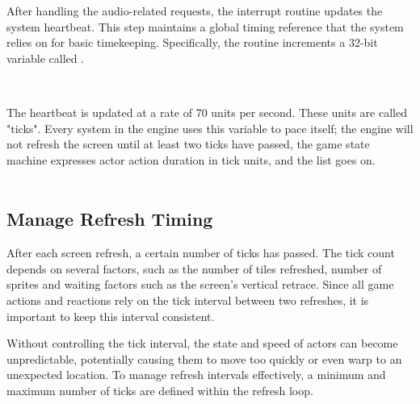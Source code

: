 \documentclass[book.tex]{subfiles}
\begin{document}
\bigskip
\par
\begin{minipage}{\textwidth}

\end{minipage}


\par
After handling the audio-related requests, the interrupt routine updates the system heartbeat. This step maintains a global timing reference that the system relies on for basic timekeeping. Specifically, the routine increments a 32-bit variable called .\\

\par
\begin{minipage}{\textwidth}

\end{minipage}\\

\par
The heartbeat is updated at a rate of 70 units per second. These units are called "ticks". Every system in the engine uses this variable to pace itself; the engine will not refresh the screen until at least two ticks have passed, the game state machine expresses actor action duration in tick units, and the list goes on.\\

\\


\subsection{Manage Refresh Timing}
After each screen refresh, a certain number of ticks has passed. The tick count depends on several factors, such as the number of tiles refreshed, number of sprites and waiting factors such as the screen's vertical retrace. Since all game actions and reactions rely on the tick interval between two refreshes, it is important to keep this interval consistent.

\par
Without controlling the tick interval, the state and speed of actors can become unpredictable, potentially causing them to move too quickly or even warp to an unexpected location. To manage refresh intervals effectively, a minimum and maximum number of ticks are defined within the refresh loop.\\
\end{document}
